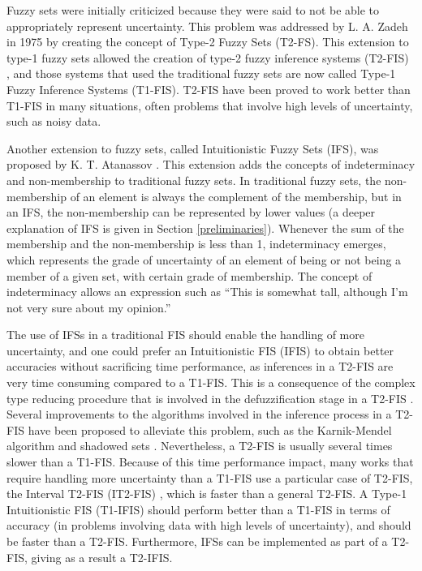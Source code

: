 \documentclass[conference]{IEEEtran}
\begin{document}
Fuzzy sets were initially criticized because they were said to
not be able to appropriately represent uncertainty. This problem was
addressed by L. A. Zadeh in 1975 \cite{zadeh1975concept} by creating the
concept of Type-2 Fuzzy Sets (T2-FS). This extension to type-1 fuzzy sets allowed the creation of
type-2 fuzzy inference systems (T2-FIS) \cite{mendel2002type}, and those systems that used the
traditional fuzzy sets are now called Type-1 Fuzzy Inference Systems
(T1-FIS). T2-FIS have been proved to work better than T1-FIS in many
situations, often problems that involve high levels of uncertainty, such as
noisy data.

Another extension to fuzzy sets, called Intuitionistic Fuzzy Sets
(IFS), was proposed by K. T. Atanassov
\cite{atanassov1986intuitionistic}. This extension adds the concepts
of indeterminacy and non-membership to traditional fuzzy sets. In
traditional fuzzy sets, the non-membership of an element is always the
complement of the membership, but in an IFS, the non-membership can be
represented by lower values (a deeper explanation of IFS is given in
Section \ref{preliminaries}). Whenever the sum of the membership and
the non-membership is less than 1, indeterminacy emerges, which
represents the grade of uncertainty of an element of being or not
being a member of a given set, with certain grade of membership. The
concept of indeterminacy allows an expression such as ``This is
somewhat tall, although I'm not very sure about my opinion.''

The use of IFSs in a traditional FIS should enable the handling of more
uncertainty, and one could prefer an Intuitionistic FIS (IFIS) to obtain
better accuracies without sacrificing time performance, as
inferences in a T2-FIS are very time consuming compared to a
T1-FIS. This is a consequence of the complex type
reducing procedure that is involved in the defuzzification stage in a
T2-FIS \cite{mendel2001uncertain}. Several improvements to the
algorithms involved in the inference process in a T2-FIS have been proposed
to alleviate this problem, such as the Karnik-Mendel algorithm
\cite{wu2009enhanced} and shadowed sets
\cite{pedrycz1998shadowed}. Nevertheless, a T2-FIS is usually several
times slower than a T1-FIS. Because of this time performance impact,
many works that require handling more uncertainty than a T1-FIS
use a particular case of T2-FIS, the Interval T2-FIS (IT2-FIS)
\cite{mendel2006interval}, which is faster than a general T2-FIS. A Type-1
Intuitionistic FIS (T1-IFIS) should perform better than a T1-FIS in terms
of accuracy (in problems involving data with high levels of
uncertainty), and should be faster than a T2-FIS. Furthermore, IFSs
can be implemented as part of a T2-FIS, giving as a result a T2-IFIS.
\end{document}
